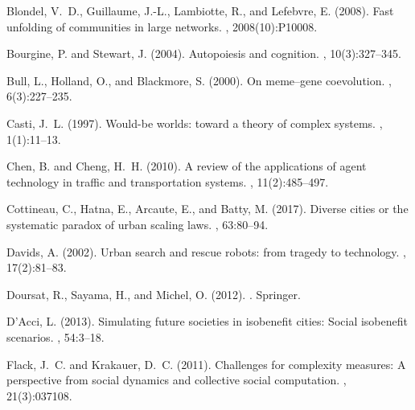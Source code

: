 \documentclass[letterpaper]{article}
\begin{document}
\begin{thebibliography}{}
Blondel, V.~D., Guillaume, J.-L., Lambiotte, R., and Lefebvre, E. (2008).
\newblock Fast unfolding of communities in large networks.
,
  2008(10):P10008.

Bourgine, P. and Stewart, J. (2004).
\newblock Autopoiesis and cognition.
, 10(3):327--345.

Bull, L., Holland, O., and Blackmore, S. (2000).
\newblock On meme--gene coevolution.
, 6(3):227--235.

Casti, J.~L. (1997).
\newblock Would-be worlds: toward a theory of complex systems.
, 1(1):11--13.

Chen, B. and Cheng, H.~H. (2010).
\newblock A review of the applications of agent technology in traffic and
  transportation systems.
,
  11(2):485--497.

Cottineau, C., Hatna, E., Arcaute, E., and Batty, M. (2017).
\newblock Diverse cities or the systematic paradox of urban scaling laws.
, 63:80--94.

Davids, A. (2002).
\newblock Urban search and rescue robots: from tragedy to technology.
, 17(2):81--83.

Doursat, R., Sayama, H., and Michel, O. (2012).
.
\newblock Springer.

D’Acci, L. (2013).
\newblock Simulating future societies in isobenefit cities: Social isobenefit
  scenarios.
, 54:3--18.

Flack, J.~C. and Krakauer, D.~C. (2011).
\newblock Challenges for complexity measures: A perspective from social
  dynamics and collective social computation.
,
  21(3):037108.


\end{thebibliography}
\end{document}
